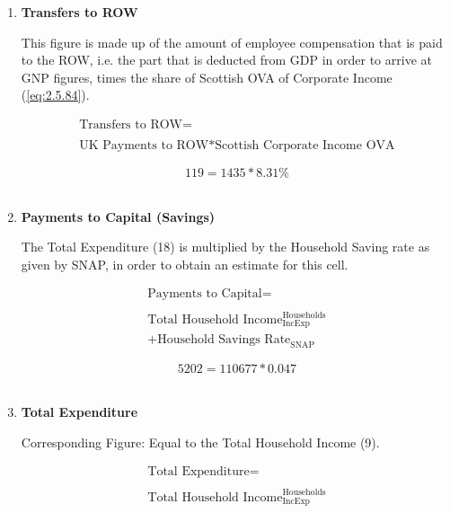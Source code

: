 \begin{enumerate}
\item \textbf {Transfers to ROW}

This figure is made up of the amount of employee compensation that is paid to the ROW, i.e. the part that is deducted from GDP in order to arrive at GNP figures, times the share of Scottish OVA of Corporate Income (\ref{eq:2.5.84}). \cite{ONS2011c}

\begin{equation}
\begin{split}
\text{Transfers to ROW} =  \\ \\
\text{UK Payments to ROW}*\text{Scottish Corporate Income OVA}
\end{split} \label{eq:2.5.19}
\end{equation}

\begin{equation} \nonumber
119 = 1435*8.31\%
\end{equation}\\


\item \textbf {Payments to Capital (Savings)}

The Total Expenditure (18) is multiplied by the Household Saving rate as given by SNAP, in order to obtain an estimate for this cell. \cite{ScotGov2013c}

\begin{equation}
\begin{split}
\text{Payments to Capital} =  \\ \\
\text{Total Household Income}^\text{Households}_\text{IncExp}\\
+\text{Household Savings Rate}_\text{SNAP}
\end{split} \label{eq:2.5.20}
\end{equation}

\begin{equation} \nonumber
5202 = 110677*0.047
\end{equation}\\


\item \textbf {Total Expenditure}

Corresponding Figure: Equal to the Total Household Income (9).

\begin{equation}
\begin{split}
\text{Total Expenditure} =  \\ \\
\text{Total Household Income}^\text{Households}_\text{IncExp}
\end{split} \label{eq:2.5.21}
\end{equation}


\end{enumerate}
